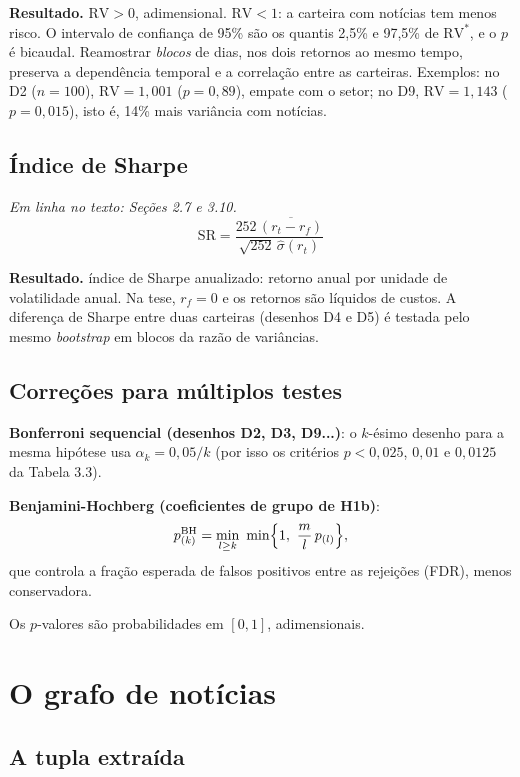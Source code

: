 \documentclass[11pt,a4paper]{article}
\newcommand{\resultado}[1]{\par\textbf{Resultado.} #1}
\begin{document}
\resultado{$\mathrm{RV}>0$, adimensional. $\mathrm{RV}<1$: a carteira com notícias tem menos risco.
O intervalo de confiança de 95\% são os quantis 2,5\% e 97,5\% de $\mathrm{RV}^*$, e o $p$ é bicaudal.
Reamostrar \emph{blocos} de dias, nos dois retornos ao mesmo tempo, preserva a dependência temporal e a
correlação entre as carteiras. Exemplos: no D2 ($n=100$), $\mathrm{RV}=1{,}001$ ($p=0{,}89$), empate com
o setor; no D9, $\mathrm{RV}=1{,}143$ ($p=0{,}015$), isto é, 14\% mais variância com notícias.}

\subsection{Índice de Sharpe}

{\small\textit{Em linha no texto: Seções 2.7 e 3.10.}}
\[
  \mathrm{SR}=\frac{252\,\overline{(r_t-r_f)}}{\sqrt{252}\,\hat\sigma(r_t)}
\]

\resultado{índice de Sharpe anualizado: retorno anual por unidade de volatilidade anual. Na tese, $r_f=0$
e os retornos são líquidos de custos. A diferença de Sharpe entre duas carteiras (desenhos D4 e D5) é
testada pelo mesmo \emph{bootstrap} em blocos da razão de variâncias.}

\subsection{Correções para múltiplos testes}

\textbf{Bonferroni sequencial (desenhos D2, D3, D9...)}: o $k$-ésimo desenho para a mesma hipótese usa
$\alpha_k=0{,}05/k$ (por isso os critérios $p<0{,}025$, $0{,}01$ e $0{,}0125$ da Tabela 3.3).

\textbf{Benjamini-Hochberg (coeficientes de grupo de H1b)}:
\[
  p^{\mathrm{BH}}_{(k)}=\min_{l\ge k}\ \min\Bigl\{1,\ \frac{m}{l}\,p_{(l)}\Bigr\},
\]
que controla a fração esperada de falsos positivos entre as rejeições (FDR), menos conservadora.

Os $p$-valores são probabilidades em $[0,1]$, adimensionais.

\section{O grafo de notícias}
\label{sec:grafo}

\subsection{A tupla extraída}
\end{document}
